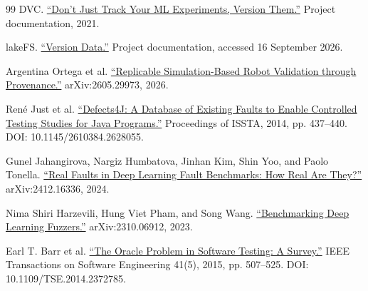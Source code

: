 \documentclass[conference]{IEEEtran}
\begin{document}
\begin{thebibliography}{99}
 DVC. \href{https://dvc.org/blog/ml-experiment-versioning/}{“Don't Just Track Your ML Experiments, Version Them.”} Project documentation, 2021.

 lakeFS. \href{https://docs.lakefs.io/guides/version-data/}{“Version Data.”} Project documentation, accessed 16 September 2026.

 Argentina Ortega et al. \href{https://arxiv.org/abs/2605.29973}{“Replicable Simulation-Based Robot Validation through Provenance.”} arXiv:2605.29973, 2026.

 René Just et al. \href{https://homes.cs.washington.edu/~mernst/pubs/bug-database-issta2014.pdf}{“Defects4J: A Database of Existing Faults to Enable Controlled Testing Studies for Java Programs.”} Proceedings of ISSTA, 2014, pp. 437--440. DOI: 10.1145/2610384.2628055.

 Gunel Jahangirova, Nargiz Humbatova, Jinhan Kim, Shin Yoo, and Paolo Tonella. \href{https://arxiv.org/abs/2412.16336}{“Real Faults in Deep Learning Fault Benchmarks: How Real Are They?”} arXiv:2412.16336, 2024.

 Nima Shiri Harzevili, Hung Viet Pham, and Song Wang. \href{https://arxiv.org/abs/2310.06912}{“Benchmarking Deep Learning Fuzzers.”} arXiv:2310.06912, 2023.

 Earl T. Barr et al. \href{https://discovery.ucl.ac.uk/id/eprint/1471263/}{“The Oracle Problem in Software Testing: A Survey.”} IEEE Transactions on Software Engineering 41(5), 2015, pp. 507--525. DOI: 10.1109/TSE.2014.2372785.

\end{thebibliography}
\end{document}
